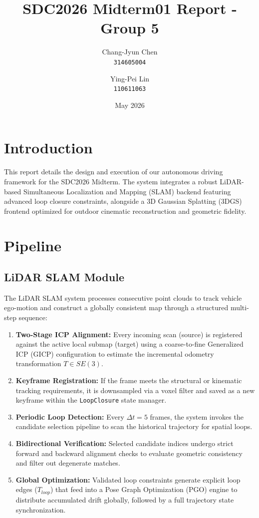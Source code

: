 \documentclass{article}
\title{\textbf{SDC2026 Midterm01 Report - Group 5}}
\author{
    Chang-Jyun Chen \\ \texttt{314605004} \and
    Ying-Pei Lin \\ \texttt{110611063}
}
\date{May 2026}
\begin{document}
\maketitle

\section{Introduction}
This report details the design and execution of our autonomous driving framework for the SDC2026 Midterm. The system integrates a robust LiDAR-based Simultaneous Localization and Mapping (SLAM) backend featuring advanced loop closure constraints, alongside a 3D Gaussian Splatting (3DGS) frontend optimized for outdoor cinematic reconstruction and geometric fidelity.

\section{Pipeline}

\subsection{LiDAR SLAM Module}
The LiDAR SLAM system processes consecutive point clouds to track vehicle ego-motion and construct a globally consistent map through a structured multi-step sequence:
\begin{enumerate}
    \item \textbf{Two-Stage ICP Alignment:} Every incoming scan (source) is registered against the active local submap (target) using a coarse-to-fine Generalized ICP (GICP) configuration to estimate the incremental odometry transformation $T \in SE(3)$.
    \item \textbf{Keyframe Registration:} If the frame meets the structural or kinematic tracking requirements, it is downsampled via a voxel filter and saved as a new keyframe within the \texttt{LoopClosure} state manager.
    \item \textbf{Periodic Loop Detection:} Every $\Delta t = 5$ frames, the system invokes the candidate selection pipeline to scan the historical trajectory for spatial loops.
    \item \textbf{Bidirectional Verification:} Selected candidate indices undergo strict forward and backward alignment checks to evaluate geometric consistency and filter out degenerate matches.
    \item \textbf{Global Optimization:} Validated loop constraints generate explicit loop edges ($T_{loop}$) that feed into a Pose Graph Optimization (PGO) engine to distribute accumulated drift globally, followed by a full trajectory state synchronization.
\end{enumerate}
\end{document}
